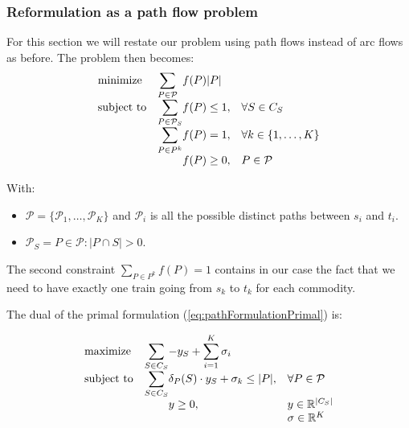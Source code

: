 \documentclass[14pt,a4paper]{article}
\theoremstyle{definition}
\numberwithin{equation}{subsection}
\begin{document}
\subsubsection{Reformulation as a path flow problem}

For this section we will restate our problem using path flows instead of arc flows as before. The problem then becomes: 
\begin{equation}
	\begin{array}{ll@{}ll}
		\text{minimize}  & \displaystyle\sum\limits_{P \in \mathcal{P}} &f(P)|P| &\\
		\text{subject to}& \displaystyle\sum\limits_{P \in \mathcal{P}_S}   &f(P) \leq 1,  &\forall S \in C_S\\
	& \displaystyle\sum\limits_{P \in P^k}   &f(P) = 1,  &\forall k \in \{1,\ldots,K\}\\
		&                                                &f(P) \geq 0, &P\in \mathcal{P}
	\end{array}
\label{eq:pathFormulationPrimal}
\end{equation}

With: 
\begin{itemize}
	\item $\mathcal{P} = \{\mathcal{P}_1,\ldots,\mathcal{P}_K\}$ and $\mathcal{P}_i$ is all the possible distinct paths between $s_i$ and $t_i$.
	\item $\mathcal{P}_S = {P \in \mathcal{P}: |P\cap S| > 0 }$.
\end{itemize}

The second constraint $\sum_{P \in P^k} f(P) = 1$ contains in our case the fact that we need to have exactly one train going from $s_k$ to $t_k$ for each commodity.


The dual of the primal formulation (\ref{eq:pathFormulationPrimal}) is:

\begin{equation}
\begin{array}{ll@{}ll}
\text{maximize}  & \displaystyle\sum\limits_{S \in C_S} &-y_S  +\displaystyle\sum\limits_{i=1}^{K}\sigma_i &\\
\text{subject to}& \displaystyle\sum\limits_{S \in C_S}   &\delta_P(S)\cdot y_S + \sigma_k \leq |P|,  &\forall P \in \mathcal{P}\\
&                                                &y \geq 0, &y \in \mathbb{R}^{|C_S|} \\
& 												 & &\sigma \in \mathbb{R}^K\\
\end{array}
\label{eq:pathFormulationDual}
\end{equation}
\end{document}

